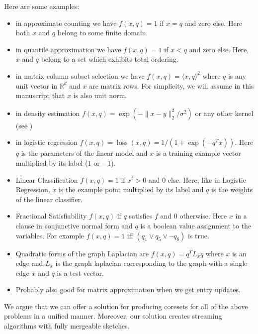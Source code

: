 \documentclass{article} %
\newcommand{\R}{\mathbb{R}}
\begin{document}
Here are some examples:
\begin{itemize}
\item in approximate counting we have $f(x, q) = 1$ if $x=q$ and zero else. Here both $x$ and $q$ belong to some finite domain.
\item in quantile approximation we have $f(x, q) = 1$ if $x<q$ and zero else. Here, $x$ and $q$ belong to a set which exhibits total ordering.
\item in matrix column subset selection we have $f(x, q) = \langle x,q \rangle ^2$ where $q$ is any unit vector in $\R^d$ and $x$ are matrix rows. For simplicity, we will assume in this manuscript that $x$ is also unit norm.
\item in density estimation $f(x, q) = \exp(- \|x-y\|_2^2/\sigma^2)$ or any other kernel (see \cite{})
\item in logistic regression $f(x, q) = \operatorname{loss}(x,q) = 1/(1 + \exp(-q^T x))$. 
Here $q$ is the parameters of the linear model and $x$ is a training example vector multiplied by its label ($1$ or $-1$).
\item Linear Classification $f(x,q) = 1$ if $x^t > 0$ and $0$ else. Here, like in Logistic Regression, $x$ is the example point multiplied by its label and $q$ is the weights of the linear classifier.
\item Fractional Satisfiability $f(x,q)$ if $q$ satisfies $f$ and $0$ otherwise. Here $x$ in a clause in conjunctive normal form and $q$ is a boolean value assignment to the variables. For example $f(x,q) = 1$ iff $(q_1 \vee q_5  \vee \neg q_8)$ is true.
\item Quadratic forms of the graph Laplacian are $f(x, q) = q^T L_x q$ where $x$ is an edge and $L_x$ is the graph laplacian corresponding to the graph with a single edge $x$ and $q$ is a test vector.
\item Probably also good for matrix approximation when we get entry updates. 
\end{itemize}

We argue that we can offer a solution for producing coresets for all of the above problems in a unified manner. 
Moreover, our solution creates streaming algorithms with fully mergeable sketches. 
\end{document}
